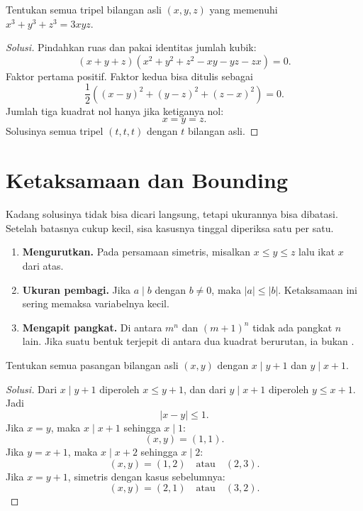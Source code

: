 \documentclass[12pt]{scrartcl}
\begin{document}
\begin{example}
Tentukan semua tripel bilangan asli $(x, y, z)$ yang memenuhi $x^3 + y^3 + z^3 = 3xyz$.
\end{example}
\begin{proof}[Solusi]
Pindahkan ruas dan pakai identitas jumlah kubik:
\[ (x + y + z)(x^2 + y^2 + z^2 - xy - yz - zx) = 0. \]
Faktor pertama positif. Faktor kedua bisa ditulis sebagai
\[ \frac{1}{2}\left((x - y)^2 + (y - z)^2 + (z - x)^2\right) = 0. \]
Jumlah tiga kuadrat nol hanya jika ketiganya nol:
\[ x = y = z. \]
Solusinya semua tripel $(t, t, t)$ dengan $t$ bilangan asli.
\end{proof}

\section{Ketaksamaan dan Bounding}

Kadang solusinya tidak bisa dicari langsung, tetapi ukurannya bisa dibatasi.
Setelah batasnya cukup kecil, sisa kasusnya tinggal diperiksa satu per satu.

\begin{fact}
\begin{enumerate}
    \item \textbf{Mengurutkan.} Pada persamaan simetris, misalkan
    $x \le y \le z$ lalu ikat $x$ dari atas.
    \item \textbf{Ukuran pembagi.} Jika $a \mid b$ dengan $b \ne 0$, maka
    $|a| \le |b|$. Ketaksamaan ini sering memaksa variabelnya kecil.
    \item \textbf{Mengapit pangkat.} Di antara $m^n$ dan $(m+1)^n$ tidak ada
    pangkat $n$ lain. Jika suatu bentuk terjepit di antara dua kuadrat
    berurutan, ia bukan .
\end{enumerate}
\end{fact}

\begin{example}
Tentukan semua pasangan bilangan asli $(x, y)$ dengan $x \mid y + 1$ dan $y \mid x + 1$.
\end{example}
\begin{proof}[Solusi]
Dari $x \mid y + 1$ diperoleh $x \le y + 1$,
dan dari $y \mid x + 1$ diperoleh $y \le x + 1$. Jadi
\[ |x - y| \le 1. \]
Jika $x = y$, maka $x \mid x + 1$ sehingga $x \mid 1$:
\[ (x, y) = (1, 1). \]
Jika $y = x + 1$, maka $x \mid x + 2$ sehingga $x \mid 2$:
\[ (x, y) = (1, 2) \quad \text{atau} \quad (2, 3). \]
Jika $x = y + 1$, simetris dengan kasus sebelumnya:
\[ (x, y) = (2, 1) \quad \text{atau} \quad (3, 2). \]
\end{proof}
\end{document}
